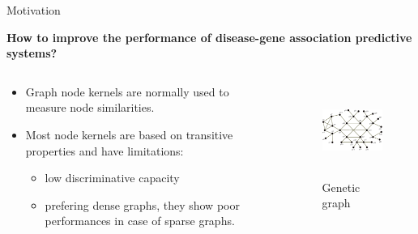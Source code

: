 \documentclass{beamer}
\begin{document}
\begin{frame}[t]{Motivation}
\vspace{-.3cm}
\begin{block}{}
			\textbf{How to improve the performance of disease-gene association predictive systems?}
	\end{block}
\begin{columns}[T] %
\begin{column}{.65\textwidth}
	\begin{itemize}
		\item Graph node kernels are normally used to measure node similarities. \vspace{.4em}
		\item Most node kernels are based on transitive properties and have limitations:\vspace{.4em}
		\begin{itemize}
			\item low discriminative capacity \vspace{.4em}
			\item prefering dense graphs, they show poor performances in case of sparse graphs.
		\end{itemize}
	\end{itemize}
\end{column}%
\begin{column}{.4\textwidth}
	\begin{figure}
	  \includegraphics[width=1.0\textwidth, height=3.0cm]{images/example.pdf}
	  \caption{Genetic graph}
	\end{figure}

\end{column}%
\end{columns}
\end{frame}
\end{document}
